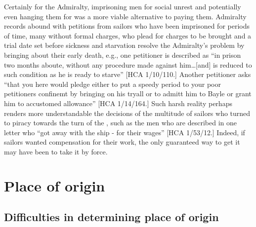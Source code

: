 Certainly for the Admiralty, imprisoning men for social unrest and potentially even hanging them for  was a more viable alternative to paying them. Admiralty records abound with petitions from sailors who have been imprisoned for  periods of time, many without formal charges, who plead for charges to be brought and a trial date set before sickness and starvation resolve the Admiralty’s problem by bringing about their early death, e.g., one petitioner is described as “in prison two months aboute, without any procedure made against him…[and] is reduced to such condition as he is ready to starve” [HCA 1/10/110.] Another petitioner asks “that you here would pledge either to put a speedy period to your poor petitioners confinemt by bringing on his tryall or to admitt him to Bayle or grant him to accustomed allowance” [HCA 1/14/164.] Such harsh reality perhaps renders more understandable the decisions of the multitude of sailors who turned to piracy towards the turn of the , such as the men who are described in one letter who “got away with the ship - for their wages” [HCA 1/53/12.] Indeed, if sailors wanted compensation for their work, the only guaranteed way to get it may have been to take it by force. 

\section{{Place of origin} }\label{sec:3.9}


\subsection{{Difficulties in determining place of origin}}\label{sec:3.9.1}


